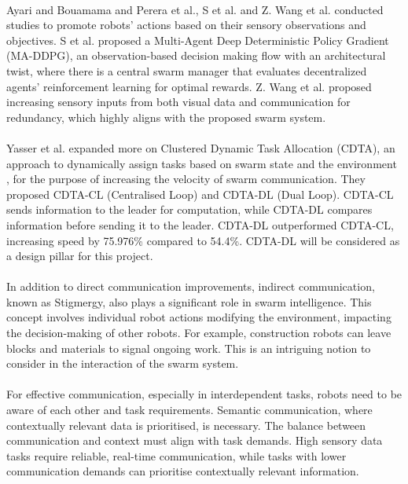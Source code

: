 \paragraph*{}
Ayari and Bouamama\cite{ayari2023evolutionary} and Perera et al.\cite{perera2022integrating}, S et al.\cite{sr2023control} and Z. Wang et al.\cite{wang2024decentralized} conducted studies to promote robots’ actions based on their sensory observations and objectives. S et al.\cite{sr2023control} proposed a Multi-Agent Deep Deterministic Policy Gradient (MA-DDPG), an observation-based decision making flow with an architectural twist, where there is a central swarm manager that evaluates decentralized agents' reinforcement learning for optimal rewards. Z. Wang et al.\cite{wang2024decentralized} proposed increasing sensory inputs from both visual data and communication for redundancy, which highly aligns with the proposed swarm system.

\paragraph*{}
Yasser et al.\cite{yasser2024optimized} expanded more on Clustered Dynamic Task Allocation (CDTA), an approach to dynamically assign tasks based on swarm state and the environment \cite{nedjah2021communication}, for the purpose of increasing the velocity of swarm communication. They proposed CDTA-CL (Centralised Loop) and CDTA-DL (Dual Loop). CDTA-CL sends information to the leader for computation, while CDTA-DL compares information before sending it to the leader. CDTA-DL outperformed CDTA-CL, increasing speed by 75.976\% compared to 54.4\%. CDTA-DL will be considered as a design pillar for this project.

\paragraph*{}
In addition to direct communication improvements, indirect communication, known as Stigmergy, also plays a significant role in swarm intelligence. This concept involves individual robot actions modifying the environment, impacting the decision-making of other robots. For example, construction robots can leave blocks and materials to signal ongoing work\cite{das2024bio}. This is an intriguing notion to consider in the interaction of the swarm system.

\paragraph*{}
For effective communication, especially in interdependent tasks, robots need to be aware of each other and task requirements. Semantic communication, where contextually relevant data is prioritised, is necessary\cite{beck2023swarm}. The balance between communication and context must align with task demands. High sensory data tasks require reliable, real-time communication, while tasks with lower communication demands can prioritise contextually relevant information\cite{zhang2021cooperative}.

